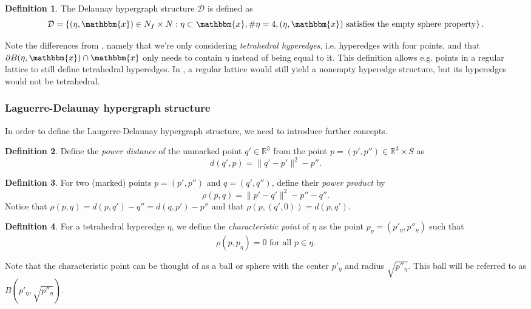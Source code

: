 \documentclass[12pt,a4paper]{article}
\newcommand{\R}{{\mathbb R^3}}
\theoremstyle{definition}
\newtheorem{definition}{Definition}
\theoremstyle{remark}
\theoremstyle{theorem}
\newcommand{\x}{\mathbbm{x}}
\begin{document}
\unsure[inline]{Is $B(\eta,\x)$ even a good notation}

\begin{definition}
The Delaunay hypergraph structure $\mathcal D$ is defined as
$$\mathcal D = \left\{ (\eta,\x) \in N_f \times N: \eta \subset \x, \# \eta = 4, (\eta,\x) \text{ satisfies the empty sphere property} \right\}. $$ 
\end{definition}

Note the differences from \cite{DDG12}, namely that we're only considering \textit{tetrahedral hyperedges}, i.e. hyperedges with four points, and that $\partial B(\eta,\x) \cap \x$ only needs to contain $\eta$ instead of being equal to it. This definition allows e.g. points in a regular lattice to still define tetrahedral hyperedges. In \cite{DDG12}, a regular lattice would still yield a nonempty hyperedge structure, but its hyperedges would not be tetrahedral. 

\subsubsection{Laguerre-Delaunay hypergraph structure}\label{sec:LD}
In order to define the Laugerre-Delaunay hypergraph structure, we need to introduce further concepts.

\begin{definition}
Define the \textit{power distance} of the unmarked point $q' \in\R$ from the point $p=(p',p'') \in \R\times S$ as
$$d(q',p) = \|q'-p'\|^2 - p''.$$
\end{definition}

\begin{definition}
For two (marked) points $p=(p',p'')$ and $q=(q',q'')$, define their \textit{power product} by
$$\rho(p,q) = \|p'-q'\|^2 - p'' - q''.$$
Notice that $\rho(p,q) = d(p,q') - q'' = d(q,p') - p''$ and that $\rho(p,(q',0)) = d(p,q')$.
\end{definition}

\begin{definition}
For a tetrahedral hyperedge $\eta$, we define the \textit{characteristic point} of $\eta$ as the point $p_\eta = (p'_\eta, p''_\eta)$ such that
$$\rho(p,p_\eta)=0 \text{ for all } p \in \eta.$$
\end{definition}
Note that the characteristic point can be thought of as a ball or sphere with the center $p'_\eta$ and radius $\sqrt{p''_\eta}$. This ball will be referred to as $B(p'_\eta,\sqrt{p''_\eta})$.
\end{document}
